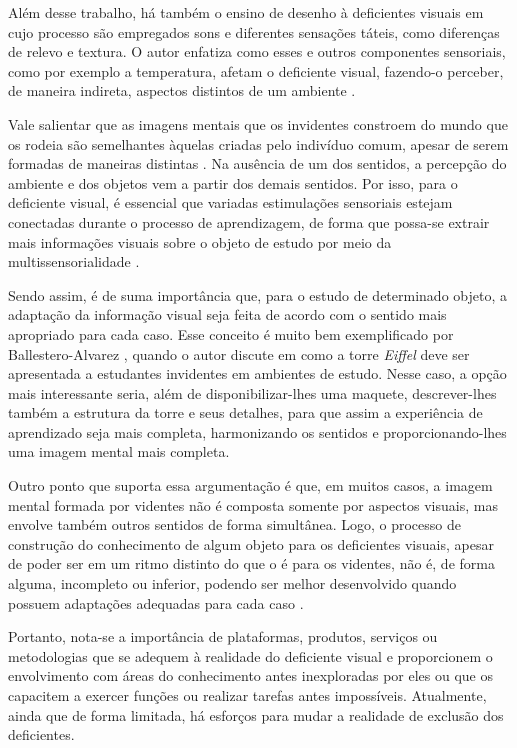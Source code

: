 Além desse trabalho, há também o ensino de desenho à deficientes visuais em cujo processo são empregados sons e diferentes sensações táteis, como diferenças de relevo e textura. O autor enfatiza como esses e outros componentes sensoriais, como por exemplo a temperatura, afetam o deficiente visual, fazendo-o perceber, de maneira indireta, aspectos distintos de um ambiente .

Vale salientar que as imagens mentais que os invidentes constroem do mundo que os rodeia são semelhantes àquelas criadas pelo indivíduo comum, apesar de serem formadas de maneiras distintas . Na ausência de um dos sentidos, a percepção do ambiente e dos objetos vem a partir dos demais sentidos. Por isso, para o deficiente visual, é essencial que variadas estimulações sensoriais estejam conectadas durante o processo de aprendizagem, de forma que possa-se extrair mais informações visuais sobre o objeto de estudo por meio da multissensorialidade .

Sendo assim, é de suma importância que, para o estudo de determinado objeto, a adaptação da informação visual seja feita de acordo com o sentido mais apropriado para cada caso. Esse conceito é muito bem exemplificado por Ballestero-Alvarez , quando o autor discute em como a torre \textit{Eiffel} deve ser apresentada a estudantes invidentes em ambientes de estudo. Nesse caso, a opção mais interessante seria, além de disponibilizar-lhes uma maquete, descrever-lhes também a estrutura da torre e seus detalhes, para que assim a experiência de aprendizado seja mais completa, harmonizando os sentidos e proporcionando-lhes uma imagem mental mais completa.

Outro ponto que suporta essa argumentação é que, em muitos casos, a imagem mental formada por videntes não é composta somente por aspectos visuais, mas envolve também outros sentidos de forma simultânea. Logo, o processo de construção do conhecimento de algum objeto para os deficientes visuais, apesar de poder ser em um ritmo distinto do que o é para os videntes, não é, de forma alguma, incompleto ou inferior, podendo ser melhor desenvolvido quando possuem adaptações adequadas para cada caso .

Portanto, nota-se a importância de plataformas, produtos, serviços ou metodologias que se adequem à realidade do deficiente visual e proporcionem o envolvimento com áreas do conhecimento antes inexploradas por eles ou que os capacitem a exercer funções ou realizar tarefas antes impossíveis. Atualmente, ainda que de forma limitada, há esforços para mudar a realidade de exclusão dos deficientes.

